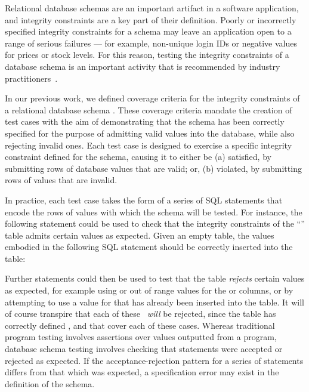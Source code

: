 Relational database schemas are an important artifact in a software application, and integrity constraints are a key part of their definition. Poorly or incorrectly specified integrity constraints for a schema may leave an application open to a range of serious failures --- for example, non-unique login IDs or negative values for prices or stock levels. For this reason, testing the integrity constraints of a database schema is an important activity that is recommended by industry practitioners~\cite{DzoneDatabaseTesting}.

In our previous work, we defined coverage criteria for the integrity constraints of a relational database schema \cite{McMinn2015}. These coverage criteria mandate the creation of test cases with the aim of demonstrating that the schema has been correctly specified for the purpose of admitting valid values into the database, while also rejecting \mbox{invalid} ones. Each test case is designed to exercise a specific integrity constraint defined for the schema, causing it to either be (a) satisfied, by submitting rows of database values that are valid; or, (b) violated, by submitting rows of values that are invalid.

In practice, each test case takes the form of a series of SQL \INSERT statements that encode the rows of values with which the schema will be tested. For instance, the following \INSERT statement could be used to check that the integrity constraints of the ``'' table admits certain values as expected. Given an empty table, the values embodied in the following SQL statement should be correctly inserted into the table:

\vspace{-.25em}
\begin{center}
\end{center}
\vspace{-.25em}

\begin{sloppypar}
Further \INSERT statements could then be used to test that the table {\it rejects} certain values as expected, for example using \NULL or out of range values for the  or  columns, or by attempting to use a value for  that has already been inserted into the table.
%
It will of course transpire that each of these \INSERTs~{\it will} be rejected, since the table has correctly defined \NOTNULL, \CHECK and \PKCs that cover each of these cases.
%
Whereas traditional program testing involves assertions over values outputted from a program, database schema testing involves checking that \INSERT statements were accepted or rejected as expected. If the acceptance-rejection pattern for a series of \INSERT statements differs from that which was expected, a specification error may exist in the definition of the schema.
\end{sloppypar}

